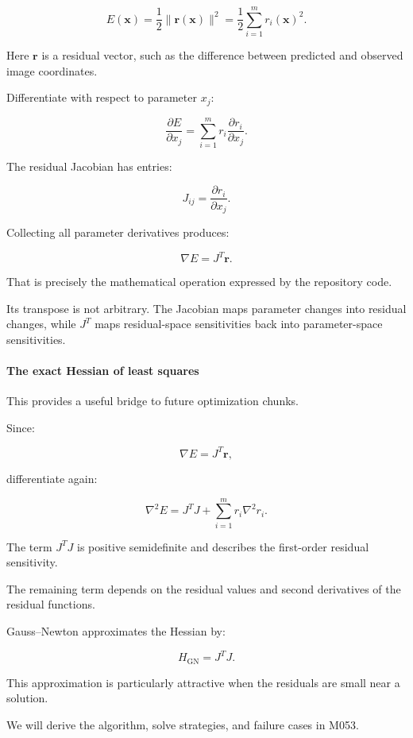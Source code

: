 \[
E(\mathbf x)=\frac12\|\mathbf r(\mathbf x)\|^2 =\frac12\sum_{i=1}^m r_i(\mathbf x)^2.
\]

Here \(\mathbf r\) is a residual vector, such as the difference between predicted and observed image coordinates.

Differentiate with respect to parameter \(x_j\):

\[
\frac{\partial E}{\partial x_j} = \sum_{i=1}^m r_i \frac{\partial r_i}{\partial x_j}.
\]

The residual Jacobian has entries:

\[
J_{ij}=\frac{\partial r_i}{\partial x_j}.
\]

Collecting all parameter derivatives produces:

\[
\boxed{ \nabla E=J^T\mathbf r }.
\]

That is precisely the mathematical operation expressed by the repository code.

Its transpose is not arbitrary. The Jacobian maps parameter changes into residual changes, while \(J^T\) maps residual-space sensitivities back into parameter-space sensitivities.

\paragraph{The exact Hessian of least squares}\label{02-foundations-ii-ch021-the-exact-hessian-of-least-squares}

\hypertarget{02-foundations-ii-ch021-the-exact-hessian-of-least-squares}{}

This provides a useful bridge to future optimization chunks.

Since:

\[
\nabla E=J^T\mathbf r,
\]

differentiate again:

\[
\boxed{ \nabla^2E = J^TJ+ \sum_{i=1}^m r_i\nabla^2r_i }.
\]

The term \(J^TJ\) is positive semidefinite and describes the first-order residual sensitivity.

The remaining term depends on the residual values and second derivatives of the residual functions.

Gauss--Newton approximates the Hessian by:

\[
H_{\mathrm{GN}}=J^TJ.
\]

This approximation is particularly attractive when the residuals are small near a solution.

We will derive the algorithm, solve strategies, and failure cases in M053.

